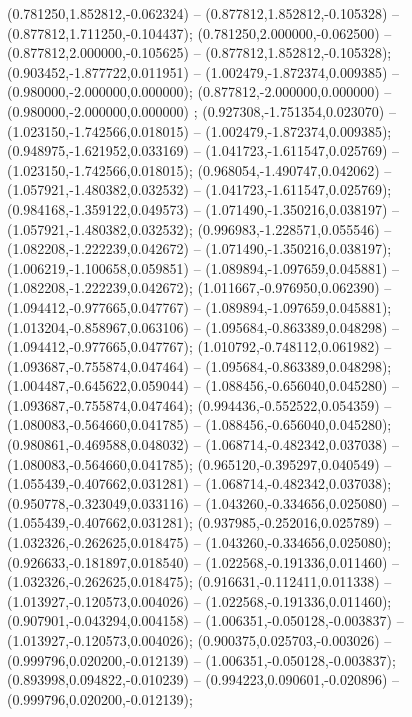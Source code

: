 (0.781250,1.852812,-0.062324) -- (0.877812,1.852812,-0.105328) -- (0.877812,1.711250,-0.104437);
 (0.781250,2.000000,-0.062500) -- (0.877812,2.000000,-0.105625) -- (0.877812,1.852812,-0.105328);
 (0.903452,-1.877722,0.011951) -- (1.002479,-1.872374,0.009385) -- (0.980000,-2.000000,0.000000);
 (0.877812,-2.000000,0.000000) -- (0.980000,-2.000000,0.000000) ;
 (0.927308,-1.751354,0.023070) -- (1.023150,-1.742566,0.018015) -- (1.002479,-1.872374,0.009385);
 (0.948975,-1.621952,0.033169) -- (1.041723,-1.611547,0.025769) -- (1.023150,-1.742566,0.018015);
 (0.968054,-1.490747,0.042062) -- (1.057921,-1.480382,0.032532) -- (1.041723,-1.611547,0.025769);
 (0.984168,-1.359122,0.049573) -- (1.071490,-1.350216,0.038197) -- (1.057921,-1.480382,0.032532);
 (0.996983,-1.228571,0.055546) -- (1.082208,-1.222239,0.042672) -- (1.071490,-1.350216,0.038197);
 (1.006219,-1.100658,0.059851) -- (1.089894,-1.097659,0.045881) -- (1.082208,-1.222239,0.042672);
 (1.011667,-0.976950,0.062390) -- (1.094412,-0.977665,0.047767) -- (1.089894,-1.097659,0.045881);
 (1.013204,-0.858967,0.063106) -- (1.095684,-0.863389,0.048298) -- (1.094412,-0.977665,0.047767);
 (1.010792,-0.748112,0.061982) -- (1.093687,-0.755874,0.047464) -- (1.095684,-0.863389,0.048298);
 (1.004487,-0.645622,0.059044) -- (1.088456,-0.656040,0.045280) -- (1.093687,-0.755874,0.047464);
 (0.994436,-0.552522,0.054359) -- (1.080083,-0.564660,0.041785) -- (1.088456,-0.656040,0.045280);
 (0.980861,-0.469588,0.048032) -- (1.068714,-0.482342,0.037038) -- (1.080083,-0.564660,0.041785);
 (0.965120,-0.395297,0.040549) -- (1.055439,-0.407662,0.031281) -- (1.068714,-0.482342,0.037038);
 (0.950778,-0.323049,0.033116) -- (1.043260,-0.334656,0.025080) -- (1.055439,-0.407662,0.031281);
 (0.937985,-0.252016,0.025789) -- (1.032326,-0.262625,0.018475) -- (1.043260,-0.334656,0.025080);
 (0.926633,-0.181897,0.018540) -- (1.022568,-0.191336,0.011460) -- (1.032326,-0.262625,0.018475);
 (0.916631,-0.112411,0.011338) -- (1.013927,-0.120573,0.004026) -- (1.022568,-0.191336,0.011460);
 (0.907901,-0.043294,0.004158) -- (1.006351,-0.050128,-0.003837) -- (1.013927,-0.120573,0.004026);
 (0.900375,0.025703,-0.003026) -- (0.999796,0.020200,-0.012139) -- (1.006351,-0.050128,-0.003837);
 (0.893998,0.094822,-0.010239) -- (0.994223,0.090601,-0.020896) -- (0.999796,0.020200,-0.012139);
